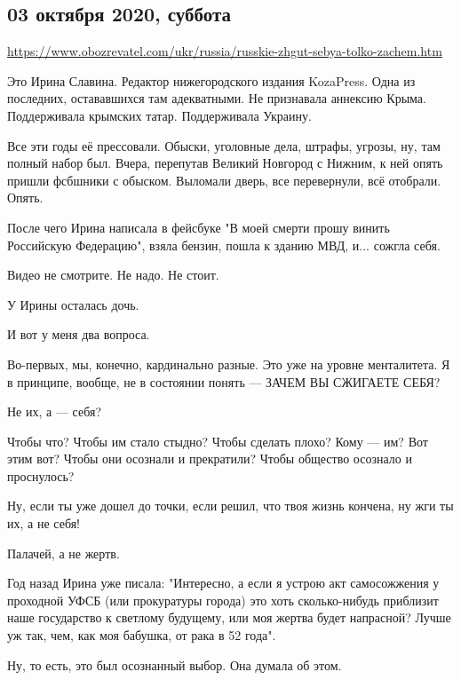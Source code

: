  
 

\subsection{03 октября 2020, суббота}
\label{sec:03_10_2020}

\url{https://www.obozrevatel.com/ukr/russia/russkie-zhgut-sebya-tolko-zachem.htm}

Это Ирина Славина. Редактор нижегородского издания KozaPress. Одна из
последних, остававшихся там адекватными. Не признавала аннексию Крыма.
Поддерживала крымских татар. Поддерживала Украину.

Все эти годы её прессовали. Обыски, уголовные дела, штрафы, угрозы, ну, там
полный набор был. Вчера, перепутав Великий Новгород с Нижним, к ней опять
пришли фсбшники с обыском. Выломали дверь, все перевернули, всё отобрали.
Опять.

После чего Ирина написала в фейсбуке "В моей смерти прошу винить Российскую
Федерацию", взяла бензин, пошла к зданию МВД, и... сожгла себя.

Видео не смотрите. Не надо. Не стоит.

У Ирины осталась дочь.

И вот у меня два вопроса.

Во-первых, мы, конечно, кардинально разные. Это уже на уровне менталитета. Я в
принципе, вообще, не в состоянии понять --- ЗАЧЕМ ВЫ СЖИГАЕТЕ СЕБЯ?

Не их, а --- себя?

Чтобы что? Чтобы им стало стыдно? Чтобы сделать плохо? Кому --- им? Вот этим вот?
Чтобы они осознали и прекратили? Чтобы общество осознало и проснулось?

Ну, если ты уже дошел до точки, если решил, что твоя жизнь кончена, ну жги ты
их, а не себя!

Палачей, а не жертв.

Год назад Ирина уже писала: "Интересно, а если я устрою акт самосожжения у
проходной УФСБ (или прокуратуры города) это хоть сколько-нибудь приблизит наше
государство к светлому будущему, или моя жертва будет напрасной? Лучше уж так,
чем, как моя бабушка, от рака в 52 года".

Ну, то есть, это был осознанный выбор. Она думала об этом.

